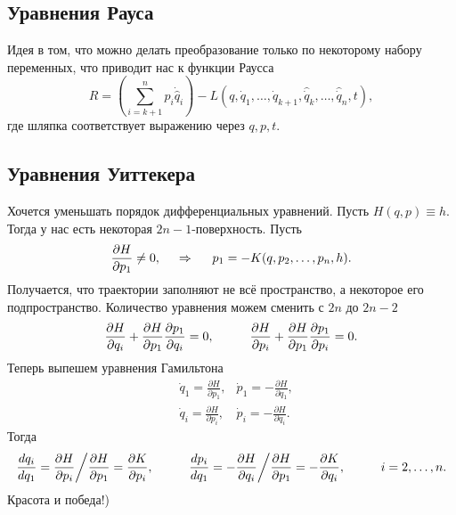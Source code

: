 \subsection{Уравнения Рауса}

Идея в том, что можно делать преобразование только по некоторому набору переменных, что приводит нас к функции Раусса
\begin{equation*}
    R = \left(\sum_{i = k + 1}^{n} p_i \dot{\hat{q}}_i\right) - 
    L (q, \dot{q}_1, \ldots, \dot{q}_{k+1}, \hat{\dot{q}}_{k}, \ldots, \hat{\dot{q}}_n, t),
\end{equation*}
где шляпка соответствует выражению через $q ,p ,t$. 

\subsection{Уравнения Уиттекера}

Хочется уменьшать порядок дифференциальных уравнений. Пусть $H(q, p) \equiv h$. Тогда у нас есть некоторая $2n-1$-поверхность. Пусть
\begin{equation*}
    \frac{\partial H}{\partial p_1} \neq 0,
    \hspace{0.5cm} \Rightarrow \hspace{0.5cm}
    p_1 = - K(q, p_2, \ldots, p_n, h).
\end{equation*}
Получается, что траектории заполняют не всё пространство, а некоторое его подпространство. Количество уравнения можем сменить с $2n$ до $2n-2$
\begin{equation*}
    \frac{\partial H}{\partial q_i}  + \frac{\partial H}{\partial p_1} \frac{\partial p_1}{\partial q_i}= 0,
    \hspace{1 cm}
    \frac{\partial H}{\partial p_i} + \frac{\partial H}{\partial p_1} \frac{\partial p_1}{\partial p_i} = 0.
\end{equation*}
Теперь выпешем уравнения Гамильтона 
\begin{align*}
    & \dot{q}_1 = \frac{\partial H}{\partial p_1}, 
    & \dot{p}_1 = - \frac{\partial H}{\partial q_1} , \\
    & \dot{q}_i = \frac{\partial H}{\partial p_i} , 
    & \dot{p}_i = - \frac{\partial H}{\partial q_i} .
\end{align*}
Тогда
\begin{equation}
    \frac{d q_i}{d q_1} = \frac{\partial H}{\partial p_i} \bigg/ \frac{\partial H}{\partial p_1} = \frac{\partial K}{\partial p_i},
    \hspace{0.5cm} \hspace{0.5cm}
    \frac{d p_i}{d q_1} = - \frac{\partial H}{\partial q_i} \bigg/ \frac{\partial H}{\partial p_1} = - \frac{\partial K}{\partial q_i},
    \hspace{1 cm}
    i = 2, \ldots, n.
\end{equation}
Красота и победа!)

